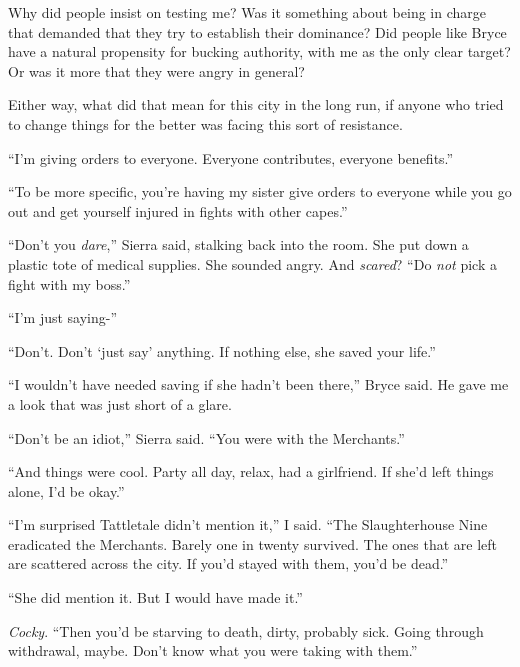 Why did people insist on testing me?  Was it something about being in charge that demanded that they try to establish their dominance?  Did people like Bryce have a natural propensity for bucking authority, with me as the only clear target?  Or was it more that they were angry in general?



Either way, what did that mean for this city in the long run, if anyone who tried to change things for the better was facing this sort of resistance.



``I'm giving orders to everyone.  Everyone contributes, everyone benefits.''



``To be more specific, you're having my sister give orders to everyone while you go out and get yourself injured in fights with other capes.''



``Don't you \emph{dare},'' Sierra said, stalking back into the room.  She put down a plastic tote of medical supplies.  She sounded angry.  And \emph{scared}?  ``Do \emph{not} pick a fight with my boss.''



``I'm just saying-''



``Don't.  Don't `just say' anything.  If nothing else, she saved your life.''



``I wouldn't have needed saving if she hadn't been there,'' Bryce said.  He gave me a look that was just short of a glare.



``Don't be an idiot,'' Sierra said.  ``You were with the Merchants.''



``And things were cool.  Party all day, relax, had a girlfriend.  If she'd left things alone, I'd be okay.''



``I'm surprised Tattletale didn't mention it,'' I said.  ``The Slaughterhouse Nine eradicated the Merchants.  Barely one in twenty survived.  The ones that are left are scattered across the city.  If you'd stayed with them, you'd be dead.''



``She did mention it.  But I would have made it.''



\emph{Cocky}.  ``Then you'd be starving to death, dirty, probably sick.  Going through withdrawal, maybe.  Don't know what you were taking with them.''



